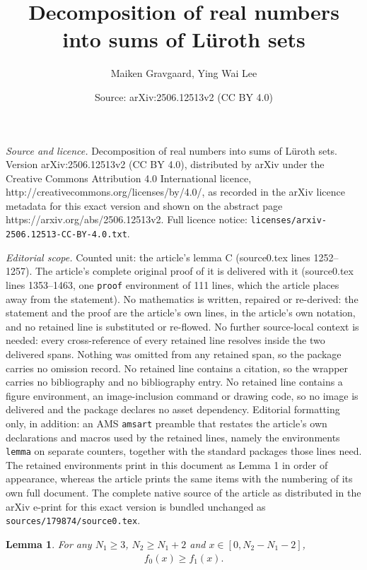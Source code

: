 \documentclass[10pt,a4paper]{amsart}
\title{Decomposition of real numbers into sums of {L\"uroth} sets}
\author{Maiken Gravgaard, Ying Wai Lee}
\date{Source: arXiv:2506.12513v2 (CC BY 4.0)}
\newtheorem{lemma}{Lemma}
\begin{document}
\maketitle

\noindent\emph{Source and licence.} Decomposition of real numbers into sums of {L\"uroth} sets. Version arXiv:2506.12513v2 (CC BY 4.0), distributed by arXiv under the Creative Commons Attribution 4.0 International licence, http://creativecommons.org/licenses/by/4.0/, as recorded in the arXiv licence metadata for this exact version and shown on the abstract page https://arxiv.org/abs/2506.12513v2. Full licence notice: \texttt{licenses/arxiv-2506.12513-CC-BY-4.0.txt}.\par\smallskip

\noindent\textit{Editorial scope.} Counted unit: the article's lemma C (source0.tex lines 1252--1257). The article's complete original proof of it is delivered with it (source0.tex lines 1353--1463, one \texttt{proof} environment of 111 lines, which the article places away from the statement). No mathematics is written, repaired or re-derived: the statement and the proof are the article's own lines, in the article's own notation, and no retained line is substituted or re-flowed.  No further source-local context is needed: every cross-reference of every retained line resolves inside the two delivered spans.  Nothing was omitted from any retained span, so the package carries no omission record.  No retained line contains a citation, so the wrapper carries no bibliography and no bibliography entry.  No retained line contains a figure environment, an image-inclusion command or drawing code, so no image is delivered and the package declares no asset dependency.  Editorial formatting only, in addition: an AMS \texttt{amsart} preamble that restates the article's own declarations and macros used by the retained lines, namely the environments \texttt{lemma} on separate counters, together with the standard packages those lines need.  The retained environments print in this document as Lemma 1 in order of appearance, whereas the article prints the same items with the numbering of its own full document.  The complete native source of the article as distributed in the arXiv e-print for this exact version is bundled unchanged as \texttt{sources/179874/source0.tex}.
	\begin{lemma}\label{lemma: tau C}
		For any $N_1\geq3$, $N_2\geq N_1+2$ and $x\in[0,N_2-N_1-2]$,
		\begin{align*}
			f_0(x)\geq f_1(x).
		\end{align*}
	\end{lemma}
\end{document}
